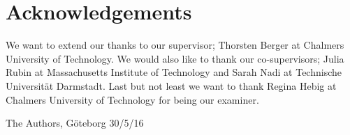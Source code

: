 \thispagestyle{plain}			%
\section*{Acknowledgements}
We want to extend our thanks to our supervisor; Thorsten Berger at Chalmers University of Technology. We would also like to thank our co-supervisors; Julia Rubin at Massachusetts Institute of Technology and Sarah Nadi at Technische Universität Darmstadt. Last but not least we want to thank Regina Hebig at Chalmers University of Technology for being our examiner.

The Authors, Göteborg 30/5/16

\newpage				%
\thispagestyle{empty}
\mbox{}

